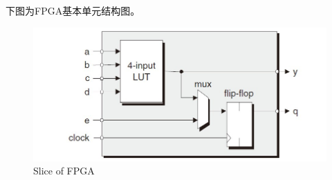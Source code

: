 下图为FPGA基本单元结构图。
\begin{figure}[H] %
    \centering
    \includegraphics{img/FPGA.jpg}
    \caption{Slice of FPGA} %
    \label{图1} %
\end{figure}